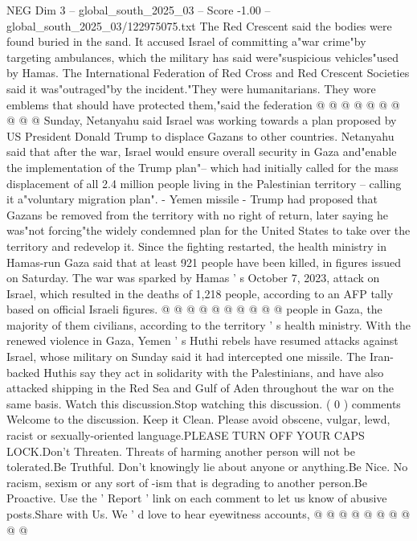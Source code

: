 \begin{textsample}{NEG Dim 3 – global\_south\_2025\_03 – Score -1.00 – global\_south\_2025\_03/122975075.txt}
The Red Crescent said the bodies were found buried in the sand.
It accused Israel of committing a"war crime"by targeting ambulances, which the military has said were"suspicious vehicles"used by Hamas.
The International Federation of Red Cross and Red Crescent Societies said it was"outraged"by the incident."They were humanitarians.
They wore emblems that should have protected them,"said the federation @ @ @ @ @ @ @ @ @ @ Sunday, Netanyahu said Israel was working towards a plan proposed by US President Donald Trump to displace Gazans to other countries.
Netanyahu said that after the war, Israel would ensure overall security in Gaza and"enable the implementation of the Trump plan"-- which had initially called for the mass displacement of all 2.4 million people living in the Palestinian territory -- calling it a"voluntary migration plan". - Yemen missile - Trump had proposed that Gazans be removed from the territory with no right of return, later saying he was"not forcing"the widely condemned plan for the United States to take over the territory and redevelop it.
Since the fighting restarted, the health ministry in Hamas-run Gaza said that at least 921 people have been killed, in figures issued on Saturday.
The war was sparked by Hamas ' s October 7, 2023, attack on Israel, which resulted in the deaths of 1,218 people, according to an AFP tally based on official Israeli figures. @ @ @ @ @ @ @ @ @ @ people in Gaza, the majority of them civilians, according to the territory ' s health ministry.
With the renewed violence in Gaza, Yemen ' s Huthi rebels have resumed attacks against Israel, whose military on Sunday said it had intercepted one missile.
The Iran-backed Huthis say they act in solidarity with the Palestinians, and have also attacked shipping in the Red Sea and Gulf of Aden throughout the war on the same basis.
Watch this discussion.Stop watching this discussion. ( 0 ) comments Welcome to the discussion.
Keep it Clean.
Please avoid obscene, vulgar, lewd, racist or sexually-oriented language.PLEASE TURN OFF YOUR CAPS LOCK.Don't Threaten.
Threats of harming another person will not be tolerated.Be Truthful.
Don't knowingly lie about anyone or anything.Be Nice.
No racism, sexism or any sort of -ism that is degrading to another person.Be Proactive.
Use the ' Report ' link on each comment to let us know of abusive posts.Share with Us.
We ' d love to hear eyewitness accounts, @ @ @ @ @ @ @ @ @ @

\end{textsample}
